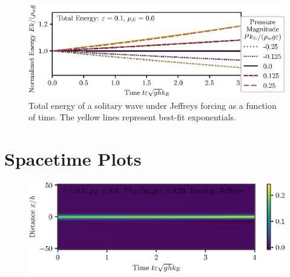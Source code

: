 \documentclass{jfm}
\let\Oldsection\section
\renewcommand{\section}{\FloatBarrier\Oldsection}
\begin{document}
\begin{figure}
  \centering
  \includegraphics{Total-Energy-Jeffreys-Solitary.eps}
  \caption{
    Total energy of a solitary wave under Jeffreys forcing as a function
    of time. The yellow lines represent best-fit exponentials.
  }
\end{figure}

\section{Spacetime Plots}
\begin{figure}
  \centering
  \includegraphics{Spacetime-Mesh_solitary.eps}
  \caption{}
\end{figure}
\end{document}
